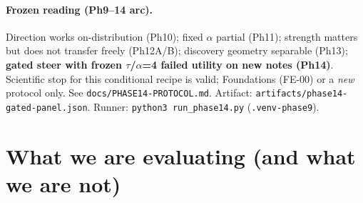 \documentclass[11pt,a4paper]{article}
\begin{document}
\paragraph{Frozen reading (Ph9--14 arc).}
Direction works on-distribution (Ph10); fixed $\alpha$ partial (Ph11); strength matters but does not transfer freely (Ph12A/B); discovery geometry separable (Ph13); \textbf{gated steer with frozen $\tau$/$\alpha$=4 failed utility on new notes (Ph14)}.
Scientific stop for this conditional recipe is valid; Foundations (FE-00) or a \emph{new} protocol only.
See \texttt{docs/PHASE14-PROTOCOL.md}. Artifact: \texttt{artifacts/phase14-gated-panel.json}.
Runner: \texttt{python3 run\_phase14.py} (\texttt{.venv-phase9}).

\section{What we are evaluating (and what we are not)}
\end{document}
